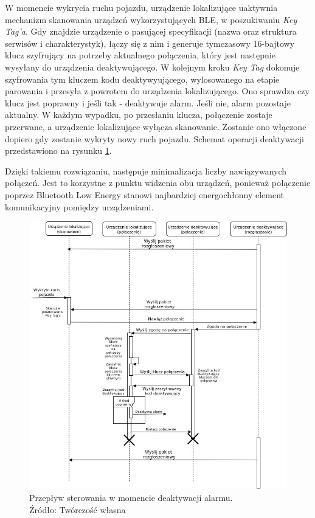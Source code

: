 W momencie wykrycia ruchu pojazdu, urządzenie lokalizujące uaktywnia mechanizm skanowania urządzeń wykorzystujących BLE, w poszukiwaniu \textit{Key Tag'a}. Gdy znajdzie urządzenie o pasującej specyfikacji (nazwa oraz struktura serwisów i charakterystyk), łączy się z nim i generuje tymczasowy 16-bajtowy klucz szyfrujący na potrzeby aktualnego połączenia, który jest następnie wysyłany do urządzenia deaktywującego. W kolejnym kroku \textit{Key Tag} dokonuje szyfrowania tym kluczem kodu deaktywyującego, wylosowanego na etapie parowania i przesyła z powrotem do urządzenia lokalizującego. Ono sprawdza czy klucz jest poprawny i jeśli tak - deaktywuje alarm. Jeśli nie, alarm pozostaje aktualny. W każdym wypadku, po przesłaniu klucza, połączenie zostaje przerwane, a urządzenie lokalizujące wyłącza skanowanie. Zostanie ono włączone dopiero gdy zostanie wykryty nowy ruch pojazdu. Schemat operacji deaktywacji przedstawiono na rysunku \ref{fig:image_soft_keytag_alarm_deactivation}.

Dzięki takiemu rozwiązaniu, następuje minimalizacja liczby nawiązywanych połączeń. Jest to korzystne z punktu widzenia obu urządzeń, ponieważ połączenie poprzez Bluetooth Low Energy stanowi najbardziej energochłonny element komunikacyjny pomiędzy urządzeniami.  

\begin{figure}[H]
	\centering
	\includegraphics[width=17cm]{img/software/keytag/alarm_deactivation.jpg}
	\caption{Przepływ sterowania w momencie deaktywacji alarmu. 
	\\Źródło: Twórczość własna}
	\label{fig:image_soft_keytag_alarm_deactivation}
\end{figure}
